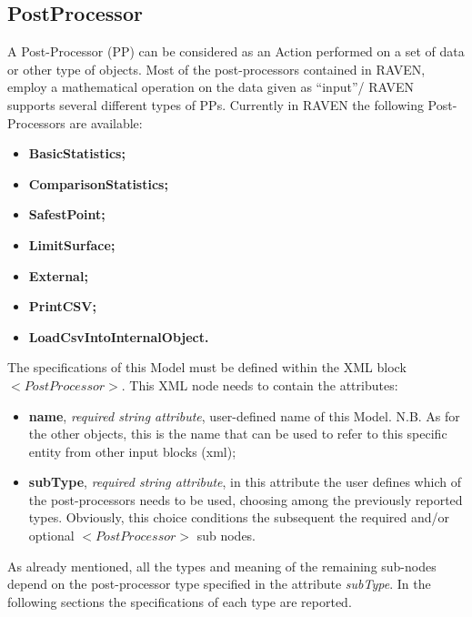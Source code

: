 \subsection{PostProcessor}
\label{sec:models_postProcessor}
A Post-Processor (PP) can be considered as an Action performed on a set of data or other type of objects. Most of the post-processors contained in RAVEN, employ a mathematical operation on the data given as ``input''/
RAVEN supports several different types of PPs. Currently in RAVEN the following Post-Processors are available:
\begin{itemize}
   \item \textbf{BasicStatistics;}
   \item \textbf{ComparisonStatistics;}
   \item \textbf{SafestPoint;}
   \item \textbf{LimitSurface;}
   \item \textbf{External;}
   \item \textbf{PrintCSV;}
   \item \textbf{LoadCsvIntoInternalObject.}
\end{itemize}
The specifications of this Model must be defined within the XML block $<PostProcessor>$. This XML node needs to contain the attributes:
\vspace{-5mm}
\begin{itemize}
\itemsep0em
\item \textbf{name}, \textit{required string attribute}, user-defined name of this Model. N.B. As for the other objects, this is the name that can be used to refer to this specific entity from other input blocks (xml);
\item \textbf{subType}, \textit{required string attribute}, in this attribute the user defines which of the post-processors needs to be used, choosing among the previously reported types. Obviously, this choice conditions the subsequent the required and/or optional $<PostProcessor>$ sub nodes.
\end{itemize}
\vspace{-5mm}
As already mentioned, all the types and meaning of the remaining sub-nodes depend on the post-processor type specified in the attribute \textit{subType}. In the following sections the specifications of each type are reported.

